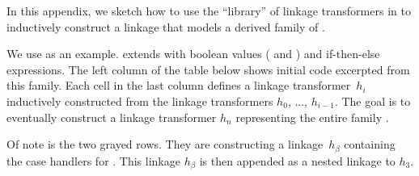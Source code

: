 In this appendix, we sketch how to use the ``library'' of linkage
transformers in \TT to inductively construct a linkage that models a
derived family of .

We use  as an example.  extends
 with boolean values ( and )
and if-then-else expressions.
The left column of the table below shows initial code excerpted from
this family.
Each cell in the last column defines a linkage transformer~$h_i$
inductively constructed from the linkage transformers $h_0$, ..., $h_{i-1}$.
The goal is to eventually construct a linkage transformer $h_n$ representing
the entire family .

Of note is the two grayed rows. They are constructing a linkage~$h_\beta$
containing the case handlers for .
This linkage $h_\beta$ is then appended as a nested linkage to $h_3$.

\medskip

